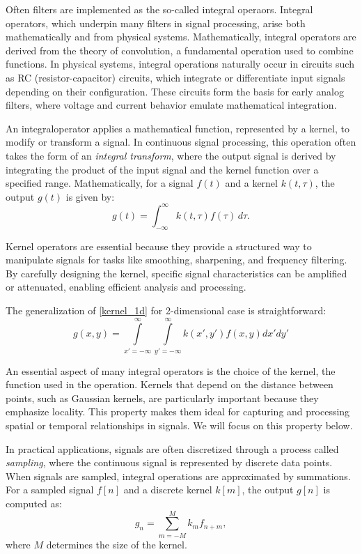 \documentclass[11pt]{book}
\begin{document}
Often filters are implemented as the so-called integral operaors. Integral operators, which underpin many filters in signal processing, arise both mathematically and from physical systems. Mathematically, integral operators are derived from the theory of convolution, a fundamental operation used to combine functions. In physical systems, integral operations naturally occur in circuits such as RC (resistor-capacitor) circuits, which integrate or differentiate input signals depending on their configuration. These circuits form the basis for early analog filters, where voltage and current behavior emulate mathematical integration.

An integraloperator applies a mathematical function, represented by a kernel, to modify or transform a signal. In continuous signal processing, this operation often takes the form of an \emph{integral transform}, where the output signal is derived by integrating the product of the input signal and the kernel function over a specified range. Mathematically, for a signal $f(t)$ and a kernel $k(t, \tau)$, the output $g(t)$ is given by:
\begin{equation}
g(t) = \int_{-\infty}^{\infty} k(t, \tau) f(\tau) \, d\tau. \label{kernel_1d} 
\end{equation}


Kernel operators are essential because they provide a structured way to manipulate signals for tasks like smoothing, sharpening, and frequency filtering. By carefully designing the kernel, specific signal characteristics can be amplified or attenuated, enabling efficient analysis and processing.

The generalization of \eqref{kernel_1d} for 2-dimensional case is straightforward:
\[
g(x,y) = \int\limits_{x'=-\infty}^\infty  \int\limits_{y'=-\infty}^\infty  k(x',y') f(x,y) dx' dy'
\]

An essential aspect of many integral operators is the choice of the kernel, the function used in the operation. Kernels that depend on the distance between points, such as Gaussian kernels, are particularly important because they emphasize locality. This property makes them ideal for capturing and processing spatial or temporal relationships in signals. We will focus on this property below.


In practical applications, signals are often discretized through a process called \emph{sampling}, where the continuous signal is represented by discrete data points. When signals are sampled, integral operations are approximated by summations. For a sampled signal $f[n]$ and a discrete kernel $k[m]$, the output $g[n]$ is computed as:
\[ 
g_n = \sum_{m=-M}^{M} k_m f_{n+m}, 
\]
where $M$ determines the size of the kernel.
\end{document}
